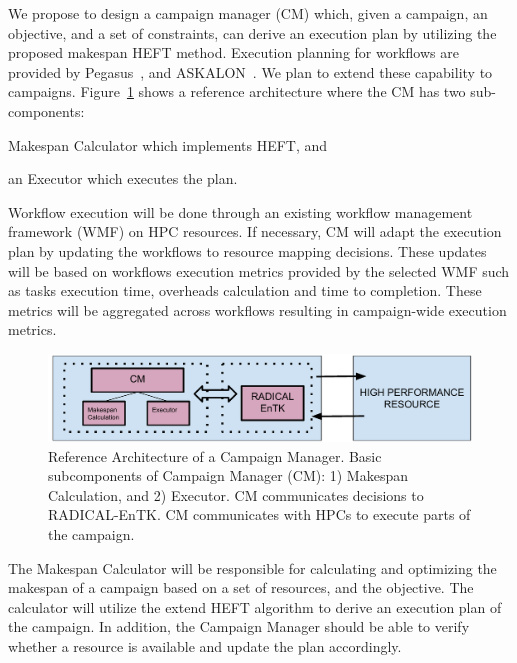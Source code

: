We propose to design a campaign manager (CM) which, given a campaign, an objective, and a set of constraints, can derive an execution plan by utilizing the proposed makespan HEFT method.
Execution planning for workflows are provided by Pegasus~\cite{deelman2015pegasus}, and ASKALON~\cite{fahringer2005askalon}.
We plan to extend these capability to campaigns.
Figure~\ref{fig:refarch} shows a reference architecture where the CM has two sub-components:
\begin{inparaenum}[(1)]
\item Makespan Calculator which implements HEFT, and
\item an Executor which executes the plan. 
\end{inparaenum}
Workflow execution will be done through an existing workflow management framework (WMF) on HPC resources.
If necessary, CM will adapt the execution plan by updating the workflows to resource mapping decisions. 
These updates will be based on workflows execution metrics provided by the selected WMF such as tasks execution time, overheads calculation and time to completion.
These metrics will be aggregated across workflows resulting in campaign-wide execution metrics.

\begin{figure}[t]
    \centering
    \includegraphics[width=.95\textwidth]{figures/CEM_RefArch.pdf}
    \caption{Reference Architecture of a Campaign Manager. Basic 
    subcomponents of Campaign Manager (CM): 1) Makespan Calculation, and 2) Executor. 
    CM communicates decisions to RADICAL-EnTK. CM communicates with HPCs to 
    execute parts of the campaign.}\label{fig:refarch}
\end{figure}

The Makespan Calculator will be responsible for calculating and optimizing the makespan of a campaign based on a set of resources, and the objective.
The calculator will utilize the extend HEFT algorithm to derive an execution plan of the campaign.
In addition, the Campaign Manager should be able to verify whether a resource is available and update the plan accordingly.

